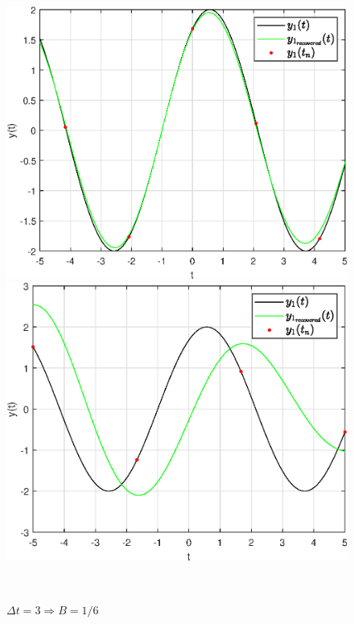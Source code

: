 \documentclass[a4paper]{article}
\begin{document}
\begin{figure}[H]
    \begin{minipage}{0.5\textwidth}
        \centering \includegraphics[width=\textwidth]{graphs2/T_50_dt_2_B_0.25_dv_0.02/func1_recovered.eps}
        \caption{$\Delta t = 2 \Rightarrow B = 0.25$}
    \end{minipage}\hfill
    \begin{minipage}{0.5\textwidth}
        \centering \includegraphics[width=\textwidth]{graphs2/T_50_dt_3_B_0.16667_dv_0.02/func1_recovered.eps}
        \caption{$\Delta t = 3 \Rightarrow B = 1/6$}
    \end{minipage}\\[1em]
\end{figure}\noindent\
\end{document}
